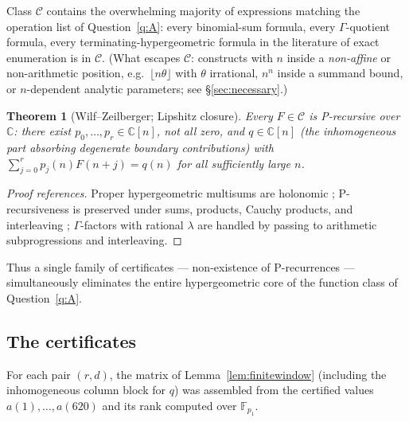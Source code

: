 \documentclass[11pt]{article}
\newtheorem{theorem}{Theorem}[section]
\theoremstyle{definition}
\newcommand{\CC}{\mathbb{C}}
\newcommand{\FF}{\mathbb{F}}
\begin{document}
Class $\mathcal{C}$ contains the overwhelming majority of expressions matching
the operation list of Question~\ref{q:A}: every binomial-sum formula, every
$\Gamma$-quotient formula, every terminating-hypergeometric formula in the
literature of exact enumeration is in $\mathcal{C}$. (What escapes
$\mathcal{C}$: constructs with $n$ inside a \emph{non-affine} or non-arithmetic
position, e.g.\ $\lfloor n\theta\rfloor$ with $\theta$ irrational, $n^n$ inside a
summand bound, or $n$-dependent analytic parameters; see
\S\ref{sec:necessary}.)

\begin{theorem}[Wilf--Zeilberger; Lipshitz closure]\label{thm:WZ}
Every $F\in\mathcal{C}$ is P-recursive over $\CC$: there exist
$p_0,\dots,p_r\in\CC[n]$, not all zero, and $q\in\CC[n]$ (the inhomogeneous part
absorbing degenerate boundary contributions) with
$\sum_{j=0}^{r}p_j(n)F(n+j)=q(n)$ for all sufficiently large $n$.
\end{theorem}

\begin{proof}[Proof references]
Proper hypergeometric multisums are holonomic
\cite{WilfZeilberger1992,PWZ1996}; P-recursiveness is preserved under sums,
products, Cauchy products, and interleaving \cite{Stanley1980,Lipshitz1989};
$\Gamma$-factors with rational $\lambda$ are handled by passing to arithmetic
subprogressions and interleaving.
\end{proof}

Thus a single family of certificates --- non-existence of P-recurrences ---
simultaneously eliminates the entire hypergeometric core of the function class
of Question~\ref{q:A}.

\subsection{The certificates}

For each pair $(r,d)$, the matrix of Lemma~\ref{lem:finitewindow} (including the
inhomogeneous column block for $q$) was assembled from the certified values
$a(1),\dots,a(620)$ and its rank computed over $\FF_{p_1}$.
\end{document}
